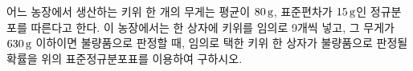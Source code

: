 \noindent\begin{minipage}[t]{0.58\linewidth}\vspace{0pt}\raggedright 어느 농장에서 생산하는 키위 한 개의 무게는 평균이 $80\mkern3mu \mathrm{g}$, 표준편차가 $15\mkern3mu \mathrm{g}$인 정규분포를 따른다고 한다. 이 농장에서는 한 상자에 키위를 임의로 9개씩 넣고, 그 무게가 $630\mkern3mu \mathrm{g}$ 이하이면 불량품으로 판정할 때, 임의로 택한 키위 한 상자가 불량품으로 판정될 확률을 위의 표준정규분포표를 이용하여 구하시오.\end{minipage}\hfill\begin{minipage}[t]{0.4\linewidth}\vspace{0pt}\centering \resizebox{\ifdim\width>\linewidth\linewidth\else\width\fi}{!}{}\end{minipage}\par
